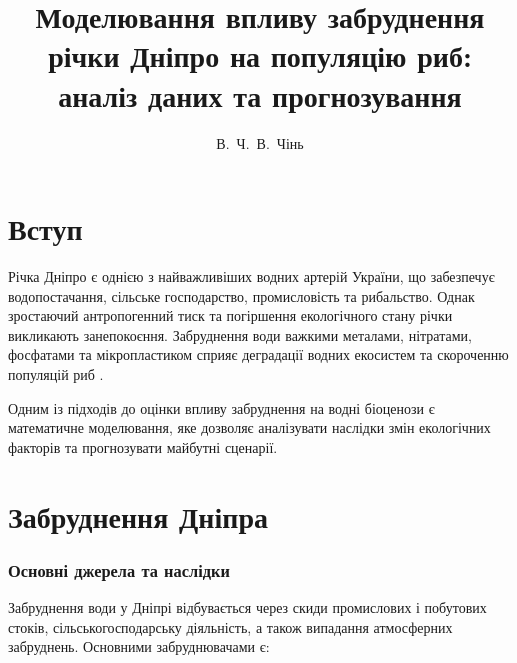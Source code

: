 \documentclass[]{iptconf}
\title{Моделювання впливу забруднення річки Дніпро на популяцію риб: аналіз даних та прогнозування}
\author{В.~Ч.~В.~Чінь}{1}
\affiliation{\ipt}{1}
\begin{document}










\section*{Вступ}





Річка Дніпро є однією з найважливіших водних артерій України, що забезпечує водопостачання, сільське господарство, промисловість та рибальство. Однак зростаючий антропогенний тиск та погіршення екологічного стану річки викликають занепокоєння. Забруднення води важкими металами, нітратами, фосфатами та мікропластиком сприяє деградації водних екосистем та скороченню популяцій риб \cite{Gryb}.

Одним із підходів до оцінки впливу забруднення на водні біоценози є математичне моделювання, яке дозволяє аналізувати наслідки змін екологічних факторів та прогнозувати майбутні сценарії.





\section{Забруднення Дніпра}




\subsubsection*{Основні джерела та наслідки}



Забруднення води у Дніпрі відбувається через скиди промислових і побутових стоків, сільськогосподарську діяльність, а також випадання атмосферних забруднень. Основними забруднювачами є:
\end{document}
